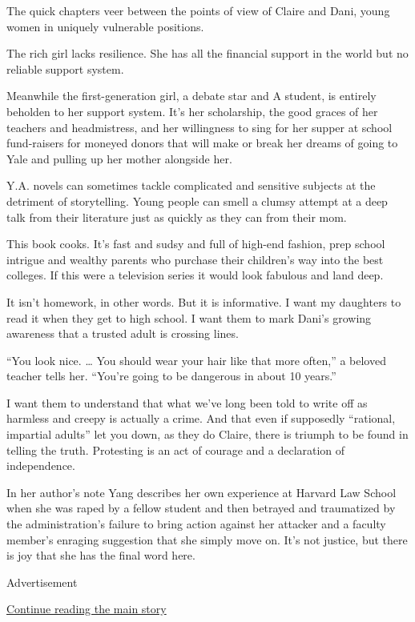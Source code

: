 The quick chapters veer between the points of view of Claire and Dani,
young women in uniquely vulnerable positions.

The rich girl lacks resilience. She has all the financial support in the
world but no reliable support system.

Meanwhile the first-generation girl, a debate star and A student, is
entirely beholden to her support system. It's her scholarship, the good
graces of her teachers and headmistress, and her willingness to sing for
her supper at school fund-raisers for moneyed donors that will make or
break her dreams of going to Yale and pulling up her mother alongside
her.

Y.A. novels can sometimes tackle complicated and sensitive subjects at
the detriment of storytelling. Young people can smell a clumsy attempt
at a deep talk from their literature just as quickly as they can from
their mom.

This book cooks. It's fast and sudsy and full of high-end fashion, prep
school intrigue and wealthy parents who purchase their children's way
into the best colleges. If this were a television series it would look
fabulous and land deep.

It isn't homework, in other words. But it is informative. I want my
daughters to read it when they get to high school. I want them to mark
Dani's growing awareness that a trusted adult is crossing lines.

``You look nice. \ldots{} You should wear your hair like that more
often,'' a beloved teacher tells her. ``You're going to be dangerous in
about 10 years.''

I want them to understand that what we've long been told to write off as
harmless and creepy is actually a crime. And that even if supposedly
``rational, impartial adults'' let you down, as they do Claire, there is
triumph to be found in telling the truth. Protesting is an act of
courage and a declaration of independence.

In her author's note Yang describes her own experience at Harvard Law
School when she was raped by a fellow student and then betrayed and
traumatized by the administration's failure to bring action against her
attacker and a faculty member's enraging suggestion that she simply move
on. It's not justice, but there is joy that she has the final word here.

Advertisement

\protect\hyperlink{after-bottom}{Continue reading the main story}

